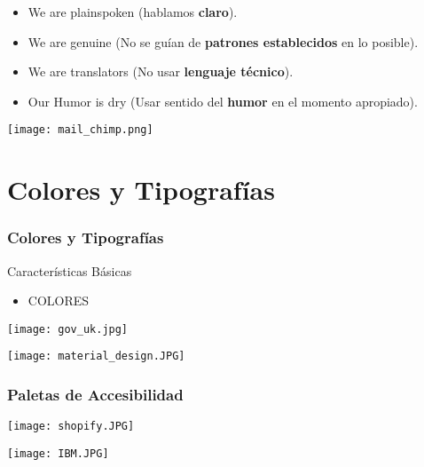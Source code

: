 \documentclass[11pt]{beamer}
\begin{document}
\begin{frame}
\begin{minipage}[c]{0.55\textwidth} 
\begin{itemize}
    \item We are plainspoken (hablamos \textbf{claro}).
    \item We are genuine (No se guían de \textbf{patrones establecidos} en lo posible).
    \item We are translators (No usar \textbf{lenguaje técnico}).
    \item Our Humor is dry (Usar sentido del \textbf{humor} en el momento apropiado).
\end{itemize}
\end{minipage}
\begin{minipage}[c]{0.30\textwidth} 
\texttt{[image: mail\_chimp.png]} 
\end{minipage}
\end{frame}


\begin{frame}
\end{frame}

\section{Colores y Tipografías}
\begin{frame}
\frametitle{Colores y Tipografías}
Características Básicas
\begin{itemize}
\item COLORES
\end{itemize}

\begin{minipage}[c]{0.6\textwidth} 
\texttt{[image: gov\_uk.jpg]} 
\end{minipage}
\begin{minipage}[c]{0.3\textwidth} 
\texttt{[image: material\_design.JPG]} 
\end{minipage} 
\end{frame}

\begin{frame}
\frametitle{Paletas de Accesibilidad}
\begin{minipage}[c]{0.5\textwidth} 
\texttt{[image: shopify.JPG]} 
\end{minipage}
\begin{minipage}[c]{0.4\textwidth} 
\texttt{[image: IBM.JPG]} 
\end{minipage} 
\end{frame}
\end{document}
